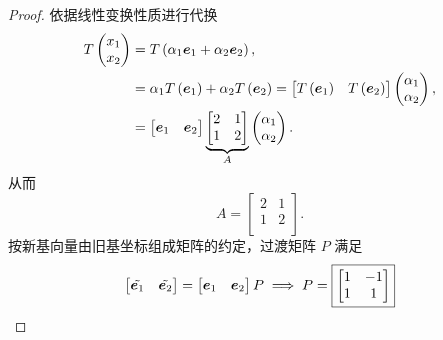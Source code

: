 \begin{proof}
依据线性变换性质进行代换
\[
\begin{aligned}
    T \begin{pmatrix}
        x_1 \\
        x_2 \\
    \end{pmatrix} &= T \left(\alpha_1 \boldsymbol{e}_1 + \alpha_2 \boldsymbol{e}_2\right), \\
    &= \alpha_1 T \left(\boldsymbol{e}_1\right) + \alpha_2 T \left(\boldsymbol{e}_2\right) = \begin{bmatrix}
        T \left(\boldsymbol{e}_1\right) & T \left(\boldsymbol{e}_2\right)
    \end{bmatrix} \begin{pmatrix}
        \alpha_1 \\
        \alpha_2 \\
    \end{pmatrix}, \\
    &= \begin{bmatrix}
        \boldsymbol{e}_1 & \boldsymbol{e}_2 \\
    \end{bmatrix} \underbrace{\begin{bmatrix}
        2 & 1 \\
        1 & 2 \\
    \end{bmatrix}}_{A} \begin{pmatrix}
        \alpha_1 \\
        \alpha_2 \\
    \end{pmatrix}.
\end{aligned}
\]
从而
\[
A = \boxed{\begin{bmatrix}
    2 & 1 \\
    1 & 2 \\
\end{bmatrix}}.
\]
按新基向量由旧基坐标组成矩阵的约定，过渡矩阵 $P$ 满足
\[
\begin{bmatrix}
    \tilde{\boldsymbol{e}_1} & \tilde{\boldsymbol{e}_2} \\
\end{bmatrix}
= \begin{bmatrix}
    \boldsymbol{e}_1 & \boldsymbol{e}_2 \\
\end{bmatrix} P
\implies
P = \boxed{\begin{bmatrix}
    1 & -1 \\
    1 & 1 \\

\end{bmatrix}}\]
\end{proof}
